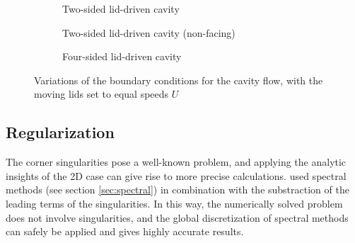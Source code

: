 \begin{figure}[h]
\centering
\begin{subfigure}[b]{0.3\textwidth}
  \centering
  \caption{Two-sided lid-driven cavity \\ \hspace{\textwidth}}
  \label{subfig:bc_2s}
\end{subfigure}
\begin{subfigure}[b]{0.3\textwidth}
  \centering
  \caption{Two-sided lid-driven cavity (non-facing)}
  \label{subfig:bc_2s_nf}
\end{subfigure}
\begin{subfigure}[b]{0.3\textwidth}
  \centering
  \caption{Four-sided lid-driven cavity \\ \hspace{\textwidth}}
  \label{subfig:bc_4s}
\end{subfigure}

\caption{Variations of the boundary conditions for the cavity flow,
 with  the moving lids set to equal speeds $U$}
\label{fig:bc_types}
\end{figure}

\subsection{Regularization} \label{sec:regul}

The corner singularities pose a well-known problem, and applying the analytic
insights of the 2D case can give rise to more precise calculations.
\cite{botella1998} used spectral methods (see section \ref{sec:spectral}) in
combination with the substraction of the leading terms of the singularities. In
this way, the numerically solved problem does not involve singularities, and
the global discretization of spectral methods can safely be applied and gives
highly accurate results. 


